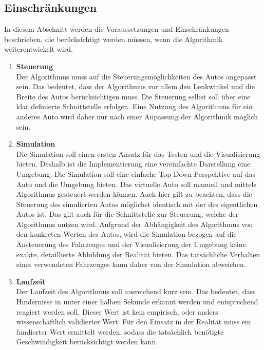 \subsection{Einschränkungen}
In diesem Abschnitt werden die Voraussetzungen und Einschränkungen beschrieben, 
die berücksichtigt werden müssen, wenn die Algorithmik weiterentwickelt wird.

\begin{enumerate}[leftmargin=*]
    \item \textbf{Steuerung} \\
    Der Algorithmus muss auf die Steuerungsmöglichkeiten des Autos angepasst sein.
    Das bedeutet, dass der Algorithmus vor allem den Lenkwinkel und die Breite des Autos berücksichtigen muss.
    Die Steuerung selbst soll über eine klar definierte Schnittstelle erfolgen.
    Eine Nutzung des Algorithmus für ein anderes Auto wird daher nur nach einer Anpassung der Algorithmik möglich sein.

    \item \textbf{Simulation} \\
    Die Simulation soll einen ersten Ansatz für das Testen und die Visualisierung bieten. 
    Deshalb ist die Implementierung eine vereinfachte Darstellung eine Umgebung.
    Die Simulation soll eine einfache Top-Down Perspektive auf das Auto und die Umgebung bieten. 
    Das virtuelle Auto soll manuell und mittels Algorithmus gesteuert werden können.
    Auch hier gilt zu beachten, dass die Steuerung des simulierten Autos möglichst identisch mit der des eigentlichen Autos ist.
    Das gilt auch für die Schnittstelle zur Steuerung, welche der Algorithmus nutzen wird.
    Aufgrund der Abhängigkeit des Algorithmus von den konkreten Werten des Autos, 
    wird die Simulation bezogen auf die Ansteuerung des Fahrzeuges und der Visualisierung der Umgebung 
    keine exakte, detaillierte Abbildung der Realität bieten. Das tatsächliche Verhalten eines verwendeten Fahrzeuges 
    kann daher von der Simulation abweichen. 

    \item \textbf{Laufzeit} \\
    Der Laufzeit des Algorithmus soll ausreichend kurz sein.
    Das bedeutet, dass Hindernisse in unter einer halben Sekunde erkannt werden und entsprechend reagiert werden soll.
    Dieser Wert ist kein empirisch, oder anders wissenschaftlich validierter Wert. 
    Für den Einsatz in der Realität muss ein fundierter Wert ermittelt werden, 
    sodass die tatsächlich benötigte Geschwindigkeit berücksichtigt werden kann.
\end{enumerate}

\newpage